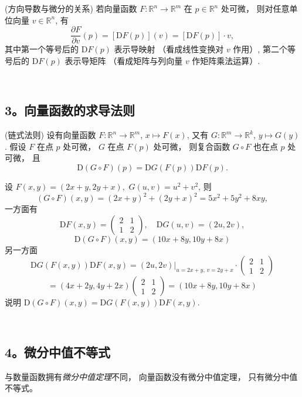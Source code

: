 \begin{theorem}{(方向导数与微分的关系)}
若向量函数 $F:\mathbb{R}^{n}\rightarrow\mathbb{R}^{m}$ 在 $p\in\mathbb{R}^{n}$
处可微， 则对任意单位向量 $v\in\mathbb{R}^{n}$, 有
\[
\frac{\partial F}{\partial v}(p)=[\mathrm{D}F(p)](v)=[\mathrm{D}F(p)]\cdot v,
\]
其中第一个等号后的 $\mathrm{D}F(p)$ 表示导映射 （看成线性变换对 $v$ 作用）, 第二个等号后的 $\mathrm{D}F(p)$
表示导矩阵 （看成矩阵与列向量 $v$ 作矩阵乘法运算）.
\end{theorem}
\verb| |

\subsection{3。向量函数的求导法则}
\begin{theorem}{(链式法则)}
设有向量函数 $F:\mathbb{R}^{n}\rightarrow\mathbb{R}^{m}$, $x\mapsto F(x)$,
又有 $G:\mathbb{R}^{m}\rightarrow\mathbb{R}^{k}$, $y\mapsto G(y)$.
假设 $F$ 在点 $p$ 处可微， $G$ 在点 $F(p)$ 处可微， 则复合函数 $G\circ F$ 也在点 $p$
处可微， 且
\[
\mathrm{D}(G\circ F)(p)=\mathrm{D}G(F(p))\mathrm{D}F(p).
\]
\end{theorem}

\begin{example}{}
设 $F(x,y)=(2x+y,2y+x),$ $G(u,v)=u^{2}+v^{2}$, 则
\[
(G\circ F)(x,y)=(2x+y)^{2}+(2y+x)^{2}=5x^{2}+5y^{2}+8xy,
\]
一方面有 
$$
\mathrm{D}F(x,y)=\left(\begin{array}{cc}
2& 1\\
1 & 2
\end{array}\right),\quad\mathrm{D}G(u,v)=(2u,2v),
$$
\[
\mathrm{D}(G\circ F)(x,y)=(10x+8y,10y+8x)
\]
另一方面 
$$
\mathrm{D}G(F(x,y))\mathrm{D}F(x,y)  =  \left.(2u,2v)\right|_{u=2x+y,\,v=2y+x}\cdot\left(\begin{array}{cc}
2 & 1\\
1 & 2
\end{array}\right)
$$
$$
  =  (4x+2y,4y+2x)\left(\begin{array}{cc}
2 & 1\\
1 & 2
\end{array}\right)
  =  (10x+8y,10y+8x)
$$
 说明 $\mathrm{D}(G\circ F)(x,y)=\mathrm{D}G(F(x,y))\mathrm{D}F(x,y)$. 
\end{example}
\verb| |

\subsection{4。微分中值不等式}
与数量函数拥有\textsl{微分中值定理}不同， 向量函数没有微分中值定理， 只有微分中值不等式。 

